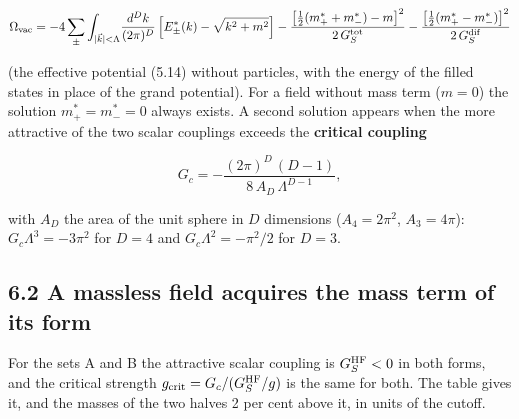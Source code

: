 \documentclass[
  10pt,
]{article}
\begin{document}
\[\Omega_{\rm vac}=-4\sum_\pm\int_{|\vec k|<\Lambda}\!\frac{d^Dk}{(2\pi)^D}\,\Big[E^*_\pm(k)-\sqrt{k^2+m^2}\Big]
-\frac{\big[\tfrac12(m^*_++m^*_-)-m\big]^2}{2\,G_S^{\rm tot}}-\frac{\big[\tfrac12(m^*_+-m^*_-)\big]^2}{2\,G_S^{\rm dif}}\]

(the effective potential (5.14) without particles, with the energy of
the filled states in place of the grand potential). For a field without
mass term (\(m=0\)) the solution \(m^*_+=m^*_-=0\) always exists. A
second solution appears when the more attractive of the two scalar
couplings exceeds the \textbf{critical coupling}

\[G_c=-\frac{(2\pi)^D\,(D-1)}{8\,A_D\,\Lambda^{D-1}},\tag{6.2}\]

with \(A_D\) the area of the unit sphere in \(D\) dimensions
(\(A_4=2\pi^2\), \(A_3=4\pi\)): \(G_c\Lambda^3=-3\pi^2\) for \(D=4\) and
\(G_c\Lambda^2=-\pi^2/2\) for \(D=3\).

\hypertarget{a-massless-field-acquires-the-mass-term-of-its-form}{%
\subsection{6.2 A massless field acquires the mass term of its
form}\label{a-massless-field-acquires-the-mass-term-of-its-form}}

For the sets A and B the attractive scalar coupling is
\(G_S^{\rm HF}<0\) in both forms, and the critical strength
\(g_{\rm crit}=G_c/(G_S^{\rm HF}/g)\) is the same for both. The table
gives it, and the masses of the two halves 2 per cent above it, in units
of the cutoff.
\end{document}
